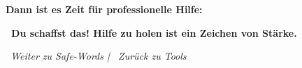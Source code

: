 \vspace{0.5cm}
\textbf{Dann ist es Zeit für professionelle Hilfe:}\\

\vspace{1cm}
\begin{center}
\textbf{\textcolor{ctmmRed}{\faHeartbeat~Du schaffst das! Hilfe zu holen ist ein Zeichen von Stärke.}}
\end{center}

\vspace{1cm}
\begin{center}
\textit{\textcolor{ctmmBlue}{\faChevronRight~Weiter zu Safe-Words} | \textcolor{ctmmPurple}{\faChevronLeft~Zurück zu Tools}}
\end{center}
